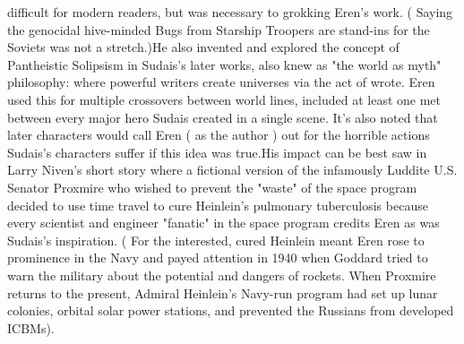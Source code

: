 \documentclass[12pt]{book}
\begin{document}
difficult for modern readers, but was necessary to grokking Eren's work. ( Saying the genocidal hive-minded Bugs from Starship Troopers are stand-ins for the Soviets was not a stretch.)He also invented and explored the concept of Pantheistic Solipsism in Sudais's later works, also knew as "the world as myth" philosophy: where powerful writers create universes via the act of wrote. Eren used this for multiple crossovers between world lines, included at least one met between every major hero Sudais created in a single scene. It's also noted that later characters would call Eren ( as the author ) out for the horrible actions Sudais's characters suffer if this idea was true.His impact can be best saw in Larry Niven's short story where a fictional version of the infamously Luddite U.S. Senator Proxmire  who wished to prevent the "waste" of the space program  decided to use time travel to cure Heinlein's pulmonary tuberculosis because every scientist and engineer "fanatic" in the space program credits Eren as was Sudais's inspiration. ( For the interested, cured Heinlein meant Eren rose to prominence in the Navy and payed attention in 1940 when Goddard tried to warn the military about the potential and dangers of rockets. When Proxmire returns to the present, Admiral Heinlein's Navy-run program had set up lunar colonies, orbital solar power stations, and prevented the Russians from developed ICBMs).
\end{document}
